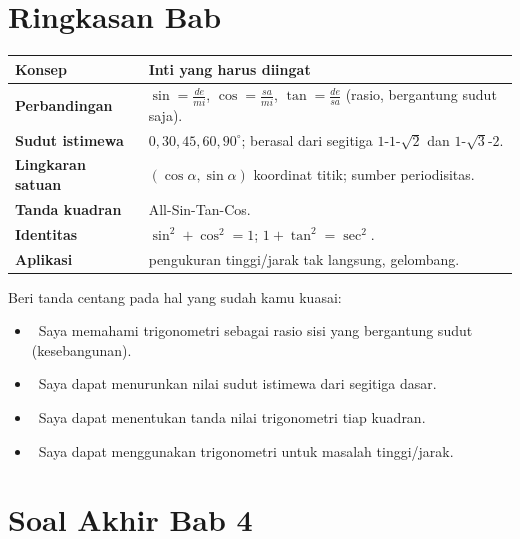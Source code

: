 \documentclass[11pt,a4paper]{report}
\theoremstyle{gaya}
\newcommand{\cek}{\ding{113}\ } %
\begin{document}
\section*{Ringkasan Bab}
\begin{center}
\begin{tabular}{>{\bfseries}p{3.5cm} p{10.2cm}}
\toprule
Konsep & Inti yang harus diingat \\
\midrule
Perbandingan & $\sin=\tfrac{de}{mi}$, $\cos=\tfrac{sa}{mi}$, $\tan=\tfrac{de}{sa}$ (rasio, bergantung sudut saja). \\
Sudut istimewa & $0,30,45,60,90^\circ$; berasal dari segitiga $1$-$1$-$\sqrt2$ dan $1$-$\sqrt3$-$2$. \\
Lingkaran satuan & $(\cos\alpha,\sin\alpha)$ koordinat titik; sumber periodisitas. \\
Tanda kuadran & All-Sin-Tan-Cos. \\
Identitas & $\sin^2+\cos^2=1$; $1+\tan^2=\sec^2$. \\
Aplikasi & pengukuran tinggi/jarak tak langsung, gelombang. \\
\bottomrule
\end{tabular}
\end{center}

\begin{refleksi}
Beri tanda centang pada hal yang sudah kamu kuasai:
\begin{itemize}[leftmargin=*,label={},topsep=2pt]
  \item \cek Saya memahami trigonometri sebagai rasio sisi yang bergantung sudut (kesebangunan).
  \item \cek Saya dapat menurunkan nilai sudut istimewa dari segitiga dasar.
  \item \cek Saya dapat menentukan tanda nilai trigonometri tiap kuadran.
  \item \cek Saya dapat menggunakan trigonometri untuk masalah tinggi/jarak.
\end{itemize}
\end{refleksi}

\section*{Soal Akhir Bab 4}
\end{document}

